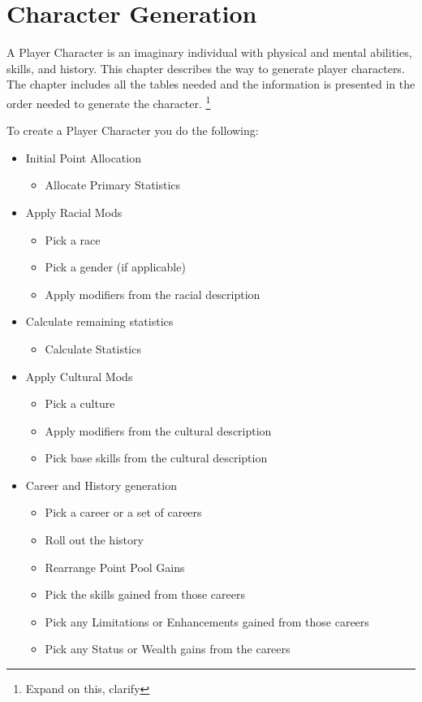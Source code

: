\chapter{Character Generation}

A {Player Character} is an imaginary individual
with physical and mental abilities, skills, and history. This chapter
describes the way to generate player characters. The chapter
includes all the tables needed and the information is presented in
the order needed to generate the character.
\footnote{Expand on this, clarify}

To create a Player Character you do the following:

\begin{itemize}
	\item Initial Point Allocation
		\begin{itemize}
			\item Allocate Primary Statistics
		\end{itemize}
    \item Apply Racial Mods
		\begin{itemize}
            \item Pick a race 
			\item Pick a gender (if applicable)
            \item Apply modifiers from the racial description
		\end{itemize}
    \item Calculate remaining statistics
		\begin{itemize}
			\item Calculate Statistics
		\end{itemize}
    \item Apply Cultural Mods
		\begin{itemize}
            \item Pick a culture 
            \item Apply modifiers from the cultural description
            \item Pick base skills from the cultural description
		\end{itemize}
    \item Career and History generation
		\begin{itemize}
			\item Pick a career or a set of careers
            \item Roll out the history
			\item Rearrange Point Pool Gains
			\item Pick the skills gained from those careers
            \item Pick any Limitations or Enhancements gained from those careers 
            \item Pick any Status or Wealth gains from the careers 
        \end{itemize} 
    \end{itemize}

